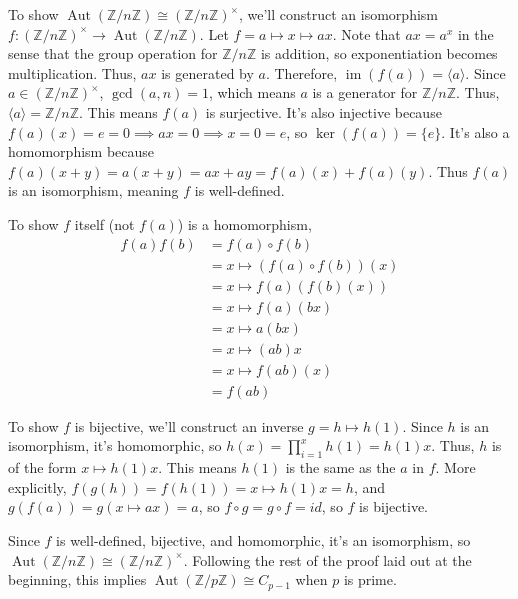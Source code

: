 \documentclass[fleqn]{article}
\DeclareMathOperator{\im}{im}
\DeclareMathOperator{\Aut}{Aut}
\begin{document}
            To show $\Aut(\mathbb{Z}/n\mathbb{Z}) \cong (\mathbb{Z}/n\mathbb{Z})^\times$, we'll construct an isomorphism $f: (\mathbb{Z}/n\mathbb{Z})^\times \to \Aut(\mathbb{Z}/n\mathbb{Z})$.  Let $f = a \mapsto x \mapsto ax$.  Note that $ax = a^x$ in the sense that the group operation for $\mathbb{Z}/n\mathbb{Z}$ is addition, so exponentiation becomes multiplication.  Thus, $ax$ is generated by $a$.  Therefore, $\im(f(a)) = \langle a \rangle$.  Since $a \in (\mathbb{Z}/n\mathbb{Z})^\times$, $\gcd(a, n) = 1$, which means $a$ is a generator for $\mathbb{Z}/n\mathbb{Z}$.  Thus, $\langle a \rangle = \mathbb{Z}/n\mathbb{Z}$.  This means $f(a)$ is surjective.  It's also injective because $f(a)(x) = e = 0 \implies ax = 0 \implies x = 0 = e$, so $\ker(f(a)) = \{e\}$.  It's also a homomorphism because $f(a)(x + y) = a(x + y) = ax + ay = f(a)(x) + f(a)(y)$.  Thus $f(a)$ is an isomorphism, meaning $f$ is well-defined.
            
            To show $f$ itself (not $f(a)$) is a homomorphism,
            \begin{align}
                f(a)f(b) 
                    &= f(a) \circ f(b) \\
                    &= x \mapsto (f(a) \circ f(b))(x) \\
                    &= x \mapsto f(a)(f(b)(x)) \\
                    &= x \mapsto f(a)(bx) \\
                    &= x \mapsto a(bx) \\
                    &= x \mapsto (ab)x \\
                    &= x \mapsto f(ab)(x) \\
                    &= f(ab)
            \end{align}
            
            To show $f$ is bijective, we'll construct an inverse $g = h \mapsto h(1)$.  Since $h$ is an isomorphism, it's homomorphic, so $h(x) = \prod\limits_{i = 1}^x h(1) = h(1)x$.  Thus, $h$ is of the form $x \mapsto h(1)x$.  This means $h(1)$ is the same as the $a$ in $f$.  More explicitly, $f(g(h)) = f(h(1)) = x \mapsto h(1)x = h$, and $g(f(a)) = g(x \mapsto ax) = a$, so $f \circ g = g \circ f = id$, so $f$ is bijective.
            
            Since $f$ is well-defined, bijective, and homomorphic, it's an isomorphism, so $\Aut(\mathbb{Z}/n\mathbb{Z}) \cong (\mathbb{Z}/n\mathbb{Z})^\times$.  Following the rest of the proof laid out at the beginning, this implies $\Aut(\mathbb{Z}/p\mathbb{Z}) \cong C_{p - 1}$ when $p$ is prime.
        
\end{document}
